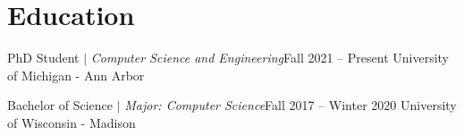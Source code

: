 \section{Education}
  \CVSubHeadingListStart
    \CVSubheading
      {{PhD Student $|$ \emph{\small{Computer Science and Engineering}}}}{Fall 2021 -- Present}
      {University of Michigan - Ann Arbor}{}

    \CVSubheading
      {{Bachelor of Science $|$ \emph{\small{Major: Computer Science}}}}{Fall 2017 -- Winter 2020}
      {University of Wisconsin - Madison}{}
  \CVSubHeadingListEnd